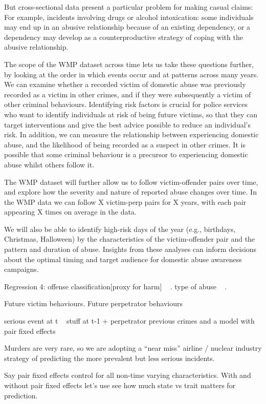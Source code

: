 \documentclass[11pt, a4paper]{article}
\begin{document}
But cross-sectional data present a particular problem for making casual claims: For example, incidents involving drugs or alcohol intoxication: some individuals may end up in an abusive relationship because of an existing dependency, or a dependency may develop as a counterproductive strategy of coping with the abusive relationship. 

The scope of the WMP dataset across time lets us take these questions further, by looking at the order in which events occur and at patterns across many years. We can examine whether a recorded victim of domestic abuse was previously recorded as a victim in other crimes, and if they were subsequently a victim of other criminal behaviours. Identifying risk factors is crucial for police services who want to identify individuals at risk of being future victims, so that they can target interventions and give the best advice possible to reduce an individual's risk. In addition, we can measure the relationship between experiencing domestic abuse, and the likelihood of being recorded as a suspect in other crimes. It is possible that some criminal behaviour is a precursor to experiencing domestic abuse whilst others follow it. 

The WMP dataset will further allow us to follow victim-offender pairs over time, and explore how the severity and nature of reported abuse changes over time. 
In the WMP data we can follow X victim-perp pairs for X years, with each pair appearing X times on average in the data.

We will also be able to identify high-risk days of the year (e.g., birthdays, Christmas, Halloween) by the characteristics of the victim-offender pair and the pattern and duration of abuse. Insights from these analyses can inform decisions about the optimal timing and target audience for domestic abuse awareness campaigns. 

Regression 4: offense classification[proxy for harm] ~ .
	type of abuse ~ .

Future victim behaviours. Future perpetrator behaviours

serious event at t ~ stuff at t-1  + perpetrator previous crimes
 and 	a model with pair fixed effects

Murders are very rare, so we are adopting a ``near miss'' airline / nuclear industry strategy of predicting the more prevalent but less serious incidents. 

Say pair fixed effects control for all non-time varying characteristics. With and without pair fixed effects let's use see how much state vs trait matters for prediction. 
\end{document}
